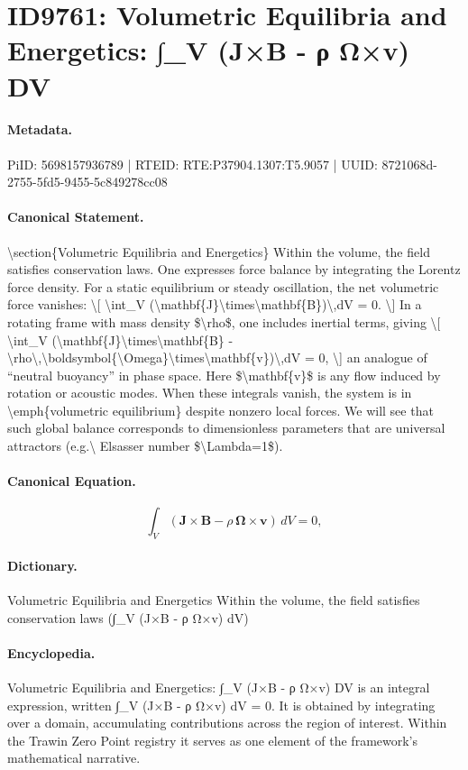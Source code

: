 \section*{ID9761: Volumetric Equilibria and Energetics: ∫\_V (J×B - ρ Ω×v) DV}
\paragraph{Metadata.}
PiID: 5698157936789 | RTEID: RTE:P37904.1307:T5.9057 | UUID: 8721068d-2755-5fd5-9455-5c849278cc08

\paragraph{Canonical Statement.}
\textbackslash{}section\{Volumetric Equilibria and Energetics\} Within the volume, the field satisfies conservation laws. One expresses force balance by integrating the Lorentz force density. For a static equilibrium or steady oscillation, the net volumetric force vanishes: \textbackslash{}[ \textbackslash{}int\_V (\textbackslash{}mathbf\{J\}\textbackslash{}times\textbackslash{}mathbf\{B\})\textbackslash{},dV = 0. \textbackslash{}] In a rotating frame with mass density \$\textbackslash{}rho\$, one includes inertial terms, giving \textbackslash{}[ \textbackslash{}int\_V (\textbackslash{}mathbf\{J\}\textbackslash{}times\textbackslash{}mathbf\{B\} - \textbackslash{}rho\textbackslash{},\textbackslash{}boldsymbol\{\textbackslash{}Omega\}\textbackslash{}times\textbackslash{}mathbf\{v\})\textbackslash{},dV = 0, \textbackslash{}] an analogue of ``neutral buoyancy'' in phase space. Here \$\textbackslash{}mathbf\{v\}\$ is any flow induced by rotation or acoustic modes. When these integrals vanish, the system is in \textbackslash{}emph\{volumetric equilibrium\} despite nonzero local forces. We will see that such global balance corresponds to dimensionless parameters that are universal attractors (e.g.\textbackslash{} Elsasser number \$\textbackslash{}Lambda=1\$).

\paragraph{Canonical Equation.}
\[
\int_V (\mathbf{J}\times\mathbf{B} - \rho\,\boldsymbol{\Omega}\times\mathbf{v})\,dV = 0,
\]

\paragraph{Dictionary.}
Volumetric Equilibria and Energetics Within the volume, the field satisfies conservation laws (∫\_V (J×B - ρ Ω×v) dV)

\paragraph{Encyclopedia.}
Volumetric Equilibria and Energetics: ∫\_V (J×B - ρ Ω×v) DV is an integral expression, written ∫\_V (J×B - ρ Ω×v) dV = 0. It is obtained by integrating over a domain, accumulating contributions across the region of interest. Within the Trawin Zero Point registry it serves as one element of the framework's mathematical narrative.
